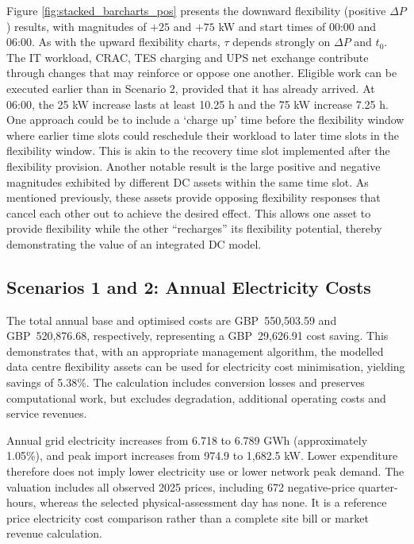 \documentclass[lettersize,journal]{IEEEtran}
\newcommand{\rev}[1]{#1}
\begin{document}
\rev{Figure \ref{fig:stacked_barcharts_pos} presents the downward flexibility (positive $\Delta P$) results, with magnitudes of $+25$ and $+75$ kW and start times of 00:00 and 06:00.} As  with the upward flexibility charts, $\tau$ depends strongly on  $\Delta P$ and $t_0$. The IT workload, CRAC, TES charging and UPS net exchange contribute through changes that may reinforce or oppose one another. Eligible work can be executed earlier than in Scenario 2, provided that it has already arrived. At 06:00, the 25 kW increase lasts at least 10.25 h and the 75 kW increase 7.25 h. One approach could be to include a `charge up' time before the flexibility window where earlier time slots could reschedule their workload to later time slots in the flexibility window. This is akin to the recovery time slot implemented after the flexibility provision. Another notable result is the large positive and negative magnitudes exhibited by different DC assets within the same time slot. As mentioned previously, these assets provide opposing flexibility responses that cancel each other out to achieve the desired effect. This allows one asset to provide flexibility while the other ``recharges'' its flexibility potential, thereby demonstrating the value of an integrated DC model.

\subsection{Scenarios 1 and 2: Annual Electricity Costs}
\rev{The total annual base and optimised costs are GBP~550,503.59 and GBP~520,876.68, respectively, representing a GBP~29,626.91 cost saving. This demonstrates that, with an appropriate management algorithm, the modelled data centre flexibility assets can be used for electricity cost minimisation, yielding savings of 5.38\%. The calculation includes conversion losses and preserves computational work, but excludes degradation, additional operating costs and service revenues.}

Annual grid electricity increases from 6.718 to 6.789 GWh (approximately 1.05\%), and peak import increases from 974.9 to 1,682.5 kW. Lower expenditure therefore does not imply lower electricity use or lower network peak demand. The valuation includes all observed 2025 prices, including 672 negative-price quarter-hours, whereas the selected physical-assessment day has none. It is a reference price electricity cost comparison rather than a complete site bill or market revenue calculation.
\end{document}
